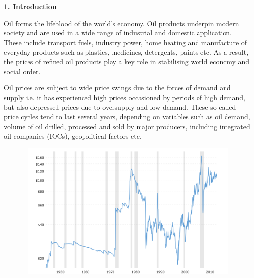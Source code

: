 \documentclass[12pt,twoside]{article}
\begin{document}
\vspace{\baselineskip}\begin{justify}
{\fontsize{13pt}{15.6pt}\selectfont \textbf{1. Introduction}\par}
\end{justify}\par

\begin{justify}
{\fontsize{11pt}{13.2pt}\selectfont Oil forms the lifeblood of the world’s economy. Oil products underpin modern society and are used in a wide range of industrial and domestic application. These include transport fuels, industry power, home heating and manufacture of everyday products such as plastics, medicines, detergents, paints etc. As a result, the prices of refined oil products play a key role in stabilising world economy and social order.\par}
\end{justify}\par

\begin{justify}
{\fontsize{11pt}{13.2pt}\selectfont Oil prices are subject to wide price swings due to the forces of demand and supply i.e. it has experienced high prices occasioned by periods of high demand, but also depressed prices due to oversupply and low demand. These so-called price cycles tend to last several years, depending on variables such as oil demand, volume of oil drilled, processed and sold by major producers, including integrated oil companies (IOCs), geopolitical factors etc.\par}
\end{justify}\par




\begin{figure}[H]
	\begin{Center}
		\includegraphics[width=4.86in,height=2.68in]{./media/image1.png}
	\end{Center}
\end{figure}
\end{document}
